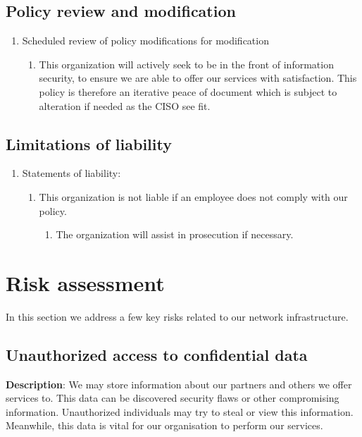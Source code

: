 \subsection{Policy review and modification}

\begin{enumerate}
  \item Scheduled review of policy modifications for modification
  \begin{enumerate}
    \item This organization will actively seek to be in the front of information security, to ensure we are able to offer our services with satisfaction. This policy is therefore an iterative peace of document which is subject to alteration if needed as the CISO see fit.
  \end{enumerate}
\end{enumerate}

\subsection{Limitations of liability}

\begin{enumerate}
  \item Statements of liability:
  \begin{enumerate}
    \item This organization is not liable if an employee does not comply with our policy.
    \begin{enumerate}
      \item The organization will assist in prosecution if necessary.
    \end{enumerate}
  \end{enumerate}
\end{enumerate}


\section{Risk assessment}

In this section we address a few key risks related to our network infrastructure.

\subsection{Unauthorized access to confidential data}

\textbf{Description}: We may store information about our partners and others we offer services to. This data can be discovered security flaws or other compromising information. Unauthorized individuals may try to steal or view this information. Meanwhile, this data is vital for our organisation to perform our services. 

